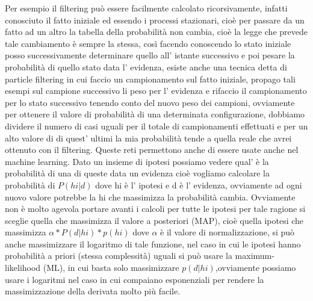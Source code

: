 		Per esempio il filtering può essere facilmente calcolato ricorsivamente, infatti conosciuto il fatto iniziale ed essendo i processi stazionari, cioè per passare da un fatto ad un altro la tabella della probabilità non cambia, cioè la legge che prevede tale cambiamento è sempre la stessa, così facendo conoscendo lo stato iniziale posso successivamente determinare quello all' istante successivo e poi pesare la probabilità di quello stato data l' evidenza, esiste anche una tecnica detta di particle filtering in cui faccio un campionamento sul fatto iniziale, propago tali esempi sul campione successivo li peso per l' evidenza e rifaccio il campionamento per lo stato successivo tenendo conto del nuovo peso dei campioni, ovviamente per ottenere il valore di probabilità di una determinata configurazione, dobbiamo dividere il numero di casi uguali per il totale di campionamenti effettuati e per un alto valore di di quest' ultimi la mia probabilità tende a quella reale che avrei ottenuto con il filtering. Queste reti permettono anche di essere usate anche nel machine learning. Dato un insieme di ipotesi possiamo vedere qual' è la probabilità di una di queste data un evidenza cioè vogliamo calcolare la probabilità di $P(hi|d)$ dove hi è l' ipotesi e d è l' evidenza, ovviamente ad ogni nuovo valore potrebbe la hi che massimizza la probabilità cambia. Ovviamente non è molto agevola portare avanti i calcoli per tutte le ipotesi per tale ragione si sceglie quella che massimizza il valore a posteriori (MAP), cioè quella ipotesi che massimizza $\alpha*P(d|hi)*p(hi)$ dove $\alpha$ è il valore di normalizzazione, si può anche massimizzare il logaritmo di tale funzione, nel caso in cui le ipotesi hanno probabilità a priori (stessa complessità) uguali si può usare la maximum-likelihood (ML), in cui basta solo massimizzare $p(d|hi)$,ovviamente possiamo usare i logaritmi nel caso in cui compaiano esponenziali per rendere la massimizzazione della derivata molto più facile.
		
